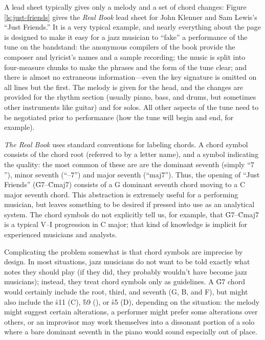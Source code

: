 A lead sheet typically gives only a melody and a set of chord changes: Figure
\ref{ls:just-friends} gives the \emph{Real Book} lead sheet for John Klenner
and Sam Lewis's ``Just Friends.'' It is a very typical example, and
nearly everything about the page is designed to make it easy for a jazz
musician to ``fake'' a performance of the tune on the bandstand: the anonymous
compilers of the book provide the composer and lyricist's names and a sample
recording; the music is split into four-measure chunks to make the phrases and
the form of the tune clear; and there is almost no extraneous
information---even the key signature is omitted on all lines but the first.
The melody is given for the head, and the changes are provided for the rhythm
section (usually piano, bass, and drums, but sometimes other instruments like
guitar) and for solos. All other aspects of the tune need to be negotiated
prior to performance (how the tune will begin and end, for example).

\emph{The Real Book} uses standard conventions for labeling chords. A chord
symbol consists of the chord root (referred to by a letter name), and a symbol
indicating the quality: the most common of these are are the dominant seventh
(simply ``$7$''), minor seventh (``--$7$'') and major seventh (``maj$7$'').
Thus, the opening of ``Just Friends'' (\h{G7}--\h{Cmaj7}) consists of a G
dominant seventh chord moving to a C major seventh chord. This abstraction is
extremely useful for a performing musician, but leaves something to be desired
if pressed into use as an analytical system. The chord symbols do not
explicitly tell us, for example, that \h{G7}--\h{Cmaj7} is a typical
V--I progression in C major; that kind of knowledge is
implicit for experienced musicians and analysts.

Complicating the problem somewhat is that chord symbols are imprecise by
design. In most situations, jazz musicians do not want to be told exactly what
notes they should play (if they did, they probably wouldn't have become jazz
musicians); instead, they treat chord symbols only as guidelines. A \h{G7}
chord would certainly include the root, third, and seventh (G, B, and F), but
might also include the \h{s11} (C\sharp), \h{b9} (\Aflat), or \h{s5} (D\sharp),
depending on the situation: the melody might suggest certain alterations, a
performer might prefer some alterations over others, or an improvisor may work
themselves into a dissonant portion of a solo where a bare dominant seventh in
the piano would sound especially out of place.

